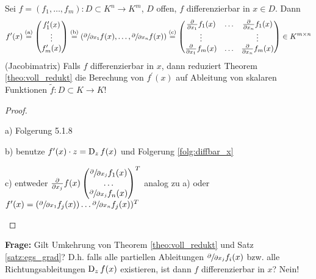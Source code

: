     \begin{theorem}\label{theo:voll_redukt}
        Sei $f = (f_1,\dots,f_m): D \subset K^n \to K^m$, $D$ offen, $f$ differenzierbar in $x \in D$. Dann
        \begin{align}%
            f^{\prime}(x) \overset{\text{(a)}}{=} 
            \begin{pmatrix}
                f_1^{\prime}(x) \\ \vdots \\ f_m^{\prime}(x)
            \end{pmatrix}
            \overset{\text{(b)}}{=}
            (\sfrac{\partial}{\partial x_1}f(x), \dots, \sfrac{\partial}{\partial x_n}f(x)) \overset{\text{(c)}}{=}
            \begin{pmatrix}
                \frac{\partial}{\partial x_1}f_1(x) & \hdots & \frac{\partial}{\partial x_n}f_1(x) \\ \vdots & & \vdots \\ \frac{\partial}{\partial x_1}f_m(x) & \hdots & \frac{\partial}{\partial x_n}f_m(x)
            \end{pmatrix} \in K^{m\times n}
        \end{align}
        (Jacobimatrix)
     Falls $f$ differenzierbar in $x$, dann reduziert Theorem \ref{theo:voll_redukt} die Berechung von $f^{\prime}(x)$ auf Ableitung von skalaren Funktionen $\tilde{f}: D\subset K \to K$!
    \end{theorem}
    \begin{proof}
        \begin{compactitem}
            \item[a)] Folgerung 5.1.8
            \item[b)] benutze $f^{\prime}(x)\cdot z = \operatorname{D}_z f(x)$ und Folgerung \ref{folg:diffbar_x}
            \item[c)] entweder $\frac{\partial}{\partial x_j}f(x) 
            \begin{pmatrix}
            \sfrac{\partial}{\partial x_j}f_1(x) \\ \hdots \\ \sfrac{\partial}{\partial x_j}f_n(x)
            \end{pmatrix}^T$ analog zu a) oder $f^{\prime}(x) = (\sfrac{\partial}{\partial x_1}f_j(x)) \dots \sfrac{\partial}{\partial x_n}f_j(x))^T$
        \end{compactitem}
    \end{proof}
    \textbf{Frage:} Gilt Umkehrung von Theorem \ref{theo:voll_redukt} und Satz \ref{satz:egs_grad}? D.h. falls alle partiellen Ableitungen $\sfrac{\partial}{\partial x_j}f_i(x)$ bzw. alle Richtungsableitungen $\operatorname{D}_zf(x)$ existieren, ist dann $f$ differenzierbar in $x$? Nein!
